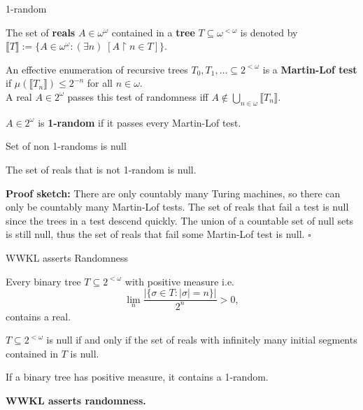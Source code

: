 \begin{frame}{1-random}
  \begin{notation*}
    The set of \textbf{reals} $A\in\omega^\omega$ contained in a
    \textbf{tree} $T\subseteq\omega^{<\omega}$ is denoted by $\llbracket
    T\rrbracket:= \{A\in\omega^\omega: (\exists n)\; [A\restriction n \in
    T]\}$.
  \end{notation*}

  \begin{define*}
    An effective enumeration of recursive trees $T_0,T_1,\ldots \subseteq
    2^{<\omega}$ is a \textbf{Martin-Lof test} if
    $\mu(\llbracket T_n\rrbracket) \leq 2^{-n}$ for all $n\in\omega$.\\
    \vspace{0.5em}
    A real $A\in2^\omega$ passes this test of randomness iff $A\not\in
    \bigcup_{n\in\omega} \llbracket T_n\rrbracket$.
  \end{define*}

  \begin{define*}[1-random]
    $A\in2^\omega$ is \textbf{1-random} if it passes every Martin-Lof test.
  \end{define*}
\end{frame}

\begin{frame}{Set of non 1-randoms is null}
  \begin{fact*}
    The set of reals that is not 1-random is null.
  \end{fact*}

  \vspace{2em}
  \textbf{Proof sketch:} There are only countably many Turing machines, so
  there can only be countably many Martin-Lof tests. The set of reals that
  fail a test is null since the trees in a test descend quickly. The union
  of a countable set of null sets is still null, thus the set of reals that
  fail some Martin-Lof test is null. $\square$
\end{frame}

\begin{frame}{WWKL asserts Randomness}
  \begin{thm*}
    Every binary tree $T\subseteq 2^{<\omega}$ with positive measure i.e.
    \[\lim_n \frac{|\{\sigma\in T: |\sigma|=n\}|}{2^n} >0,\]
    contains a real.
  \end{thm*}
  \begin{fact*}
    $T\subseteq2^{<\omega}$ is null if and only if the set of reals with
    infinitely many initial segments contained in $T$ is null.
  \end{fact*}

  \begin{coro*}
    If a binary tree has positive measure, it contains a 1-random.
  \end{coro*}

  \textbf{WWKL asserts randomness.}
\end{frame}


